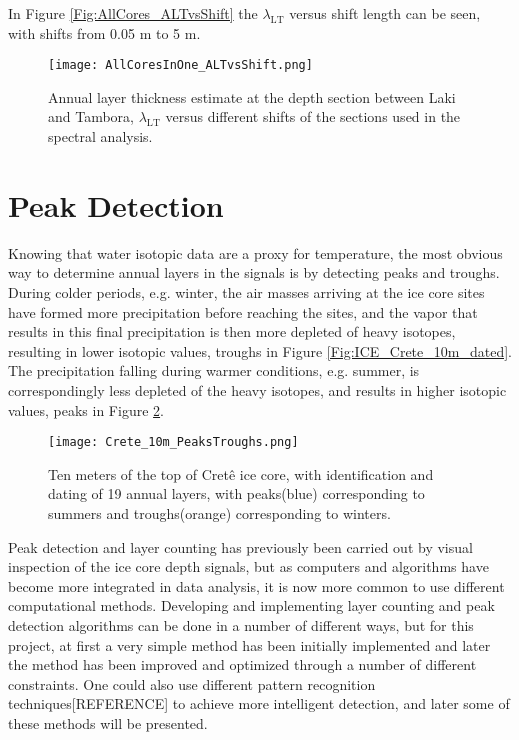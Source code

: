 \documentclass[../../CompleteThesis2/Complete_2ndDraft]{subfiles}
\begin{document}
In Figure \ref{Fig:AllCores_ALTvsShift} the $\lambda_{\text{LT}}$ versus shift length can be seen, with shifts from 0.05 m to 5 m.

\begin{figure}[h]
	\centering
	\texttt{[image: AllCoresInOne\_ALTvsShift.png]}
	\caption[$\lambda_{\text{LT}}0$ vs. $s_{\text{sec}}$]{\small Annual layer thickness estimate at the depth section between Laki and Tambora, $\lambda_{\text{LT}}$ versus different shifts of the sections used in the spectral analysis.}
	\label{fig:AllCores_ALTvsShift}
\end{figure}




\section[Peak Detection]{Peak Detection}
\label{Sec:CompMeths_PeakDetection}

Knowing that water isotopic data are a proxy for temperature, the most obvious way to determine annual layers in the signals is by detecting peaks and troughs. During colder periods, e.g. winter, the air masses arriving at the ice core sites have formed more precipitation before reaching the sites, and the vapor that results in this final precipitation is then more depleted of heavy isotopes, resulting in lower isotopic values, troughs in Figure \ref{Fig:ICE_Crete_10m_dated}. The precipitation falling during warmer conditions, e.g. summer, is correspondingly less depleted of the heavy isotopes, and results in higher isotopic values, peaks in Figure \ref{Fig:COMPMETH_Crete_10m_PeaksTroughs}.
\begin{figure}[h]
	\centering
	\texttt{[image: Crete\_10m\_PeaksTroughs.png]}
	\caption[10 m of Crête core with peaks and troughs.]{\small Ten meters of the top of Cretê ice core, with identification and dating of 19 annual layers, with peaks(blue) corresponding to summers and troughs(orange) corresponding to winters.}
	\label{Fig:COMPMETH_Crete_10m_PeaksTroughs}
\end{figure}

Peak detection and layer counting has previously been carried out by visual inspection of the ice core depth signals, but as computers and algorithms have become more integrated in data analysis, it is now more common to use different computational methods. Developing and implementing layer counting and peak detection algorithms can be done in a number of different ways, but for this project, at first a very simple method has been initially implemented and later the method has been improved and optimized through a number of different constraints. One could also use different pattern recognition techniques[REFERENCE] to achieve more intelligent detection, and later some of these methods will be presented.
\end{document}
